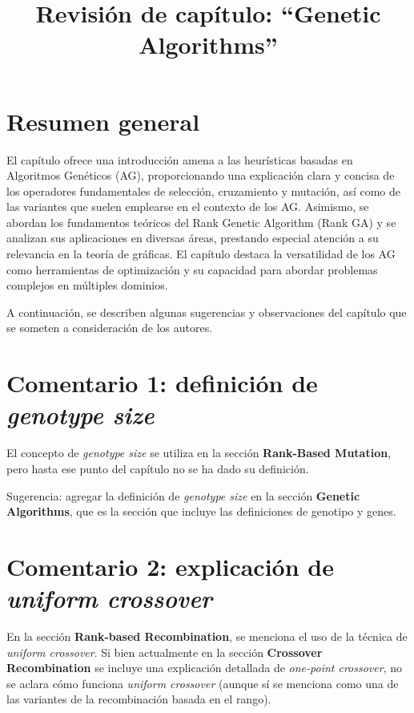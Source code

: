 \documentclass{article}
\title{Revisión de capítulo: ``Genetic Algorithms''}
\date{}
\begin{document}
\maketitle

\section*{Resumen general}

El capítulo ofrece una introducción amena a las heurísticas basadas en Algoritmos Genéticos (AG), proporcionando una explicación clara y concisa de los operadores fundamentales de selección, cruzamiento y mutación, así como de las variantes que suelen emplearse en el contexto de los AG. Asimismo, se abordan los fundamentos teóricos del Rank Genetic Algorithm (Rank GA) y se analizan sus aplicaciones en diversas áreas, prestando especial atención a su relevancia en la teoría de gráficas. El capítulo destaca la versatilidad de los AG como herramientas de optimización y su capacidad para abordar problemas complejos en múltiples dominios.

A continuación, se describen algunas sugerencias y observaciones del capítulo que se someten a consideración de los autores.

\section*{Comentario 1: definición de \textit{genotype size}}

El concepto de \textit{genotype size} se utiliza en la sección \textbf{Rank-Based Mutation}, pero hasta ese punto del capítulo no se ha dado su definición.

Sugerencia: agregar la definición de \textit{genotype size} en la sección \textbf{Genetic Algorithms}, que es la sección que incluye las definiciones de genotipo y genes.

\section*{Comentario 2: explicación de \textit{uniform crossover}}

En la sección \textbf{Rank-based Recombination}, se menciona el uso de la técnica de \textit{uniform crossover}. Si bien actualmente en la sección \textbf{Crossover Recombination} se incluye una explicación detallada de \textit{one-point crossover}, no se aclara cómo funciona \textit{uniform crossover} (aunque sí se menciona como una de las variantes de la recombinación basada en el rango).
\end{document}
